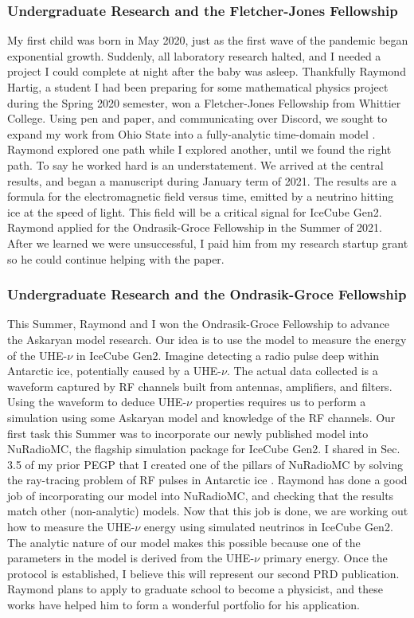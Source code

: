\documentclass[../../../main.tex]{subfiles}
\begin{document}
\subsubsection{Undergraduate Research and the Fletcher-Jones Fellowship}

My first child was born in May 2020, just as the first wave of the pandemic began exponential growth.  Suddenly, all laboratory research halted, and I needed a project I could complete at night after the baby was asleep.  Thankfully Raymond Hartig, a student I had been preparing for some mathematical physics project during the Spring 2020 semester, won a Fletcher-Jones Fellowship from Whittier College.  Using pen and paper, and communicating over Discord, we sought to expand my work from Ohio State into a fully-analytic time-domain model \cite{10.1016/j.astropartphys.2017.03.008}.  Raymond explored one path while I explored another, until we found the right path.  To say he worked hard is an understatement.  We arrived at the central results, and began a manuscript during January term of 2021.  The results are a formula for the electromagnetic field versus time, emitted by a neutrino hitting ice at the speed of light.  This field will be a critical signal for IceCube Gen2.  Raymond applied for the Ondrasik-Groce Fellowship in the Summer of 2021.  After we learned we were unsuccessful, I paid him from my research startup grant so he could continue helping with the paper.

\subsubsection{Undergraduate Research and the Ondrasik-Groce Fellowship}

This Summer, Raymond and I won the Ondrasik-Groce Fellowship to advance the Askaryan model research.  Our idea is to use the model to measure the energy of the UHE-$\nu$ in IceCube Gen2.  Imagine detecting a radio pulse deep within Antarctic ice, potentially caused by a UHE-$\nu$.  The actual data collected is a waveform captured by RF channels built from antennas, amplifiers, and filters.  Using the waveform to deduce UHE-$\nu$ properties requires us to perform a simulation using some Askaryan model and knowledge of the RF channels.  Our first task this Summer was to incorporate our newly published model into NuRadioMC, the flagship simulation package for IceCube Gen2.  I shared in Sec. 3.5 of my prior PEGP that I created one of the pillars of NuRadioMC by solving the ray-tracing problem of RF pulses in Antarctic ice \cite{10.1140/epjc/s10052-020-7612-8} \cite{horizPaper}.  Raymond has done a good job of incorporating our model into NuRadioMC, and checking that the results match other (non-analytic) models.  Now that this job is done, we are working out how to measure the UHE-$\nu$ energy using simulated neutrinos in IceCube Gen2.  The analytic nature of our model makes this possible because one of the parameters in the model is derived from the UHE-$\nu$ primary energy.  Once the protocol is established, I believe this will represent our second PRD publication.  Raymond plans to apply to graduate school to become a physicist, and these works have helped him to form a wonderful portfolio for his application.
\end{document}

